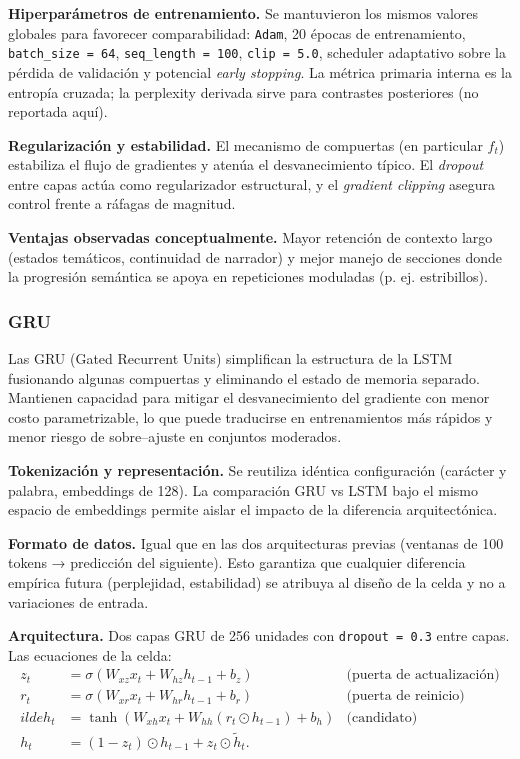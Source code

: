 \documentclass[paper=letter, fontsize=11pt, draft=false]{scrartcl}
\numberwithin{equation}{section} %
\numberwithin{figure}{section} %
\numberwithin{table}{section} %
\numberwithin{subsection}{section}
\begin{document}
\textbf{Hiperparámetros de entrenamiento.} Se mantuvieron los mismos valores globales para favorecer comparabilidad: \texttt{Adam}, 20 épocas de entrenamiento, \texttt{batch\_size = 64}, \texttt{seq\_length = 100}, \texttt{clip = 5.0}, scheduler adaptativo sobre la pérdida de validación y potencial \emph{early stopping}. La métrica primaria interna es la entropía cruzada; la perplexity derivada sirve para contrastes posteriores (no reportada aquí).

\textbf{Regularización y estabilidad.} El mecanismo de compuertas (en particular $f_t$) estabiliza el flujo de gradientes y atenúa el desvanecimiento típico. El \emph{dropout} entre capas actúa como regularizador estructural, y el \emph{gradient clipping} asegura control frente a ráfagas de magnitud.

\textbf{Ventajas observadas conceptualmente.} Mayor retención de contexto largo (estados temáticos, continuidad de narrador) y mejor manejo de secciones donde la progresión semántica se apoya en repeticiones moduladas (p. ej. estribillos). 


\subsubsection{GRU}
Las GRU (Gated Recurrent Units) simplifican la estructura de la LSTM fusionando algunas compuertas y eliminando el estado de memoria separado. Mantienen capacidad para mitigar el desvanecimiento del gradiente con menor costo parametrizable, lo que puede traducirse en entrenamientos más rápidos y menor riesgo de sobre–ajuste en conjuntos moderados.

	\textbf{Tokenización y representación.} Se reutiliza idéntica configuración (carácter y palabra, embeddings de 128). La comparación GRU vs LSTM bajo el mismo espacio de embeddings permite aislar el impacto de la diferencia arquitectónica.

	\textbf{Formato de datos.} Igual que en las dos arquitecturas previas (ventanas de 100 tokens → predicción del siguiente). Esto garantiza que cualquier diferencia empírica futura (perplejidad, estabilidad) se atribuya al diseño de la celda y no a variaciones de entrada.

	\textbf{Arquitectura.} Dos capas GRU de 256 unidades con \texttt{dropout = 0.3} entre capas. Las ecuaciones de la celda:
\[
\begin{aligned}
z_t &= \sigma(W_{xz} x_t + W_{hz} h_{t-1} + b_z) & \text{(puerta de actualización)}\\
r_t &= \sigma(W_{xr} x_t + W_{hr} h_{t-1} + b_r) & \text{(puerta de reinicio)}\\
    ilde{h}_t &= \tanh(W_{xh} x_t + W_{hh} (r_t \odot h_{t-1}) + b_h) & \text{(candidato)}\\
h_t &= (1 - z_t) \odot h_{t-1} + z_t \odot \tilde{h}_t.
\end{aligned}
\]
\end{document}
